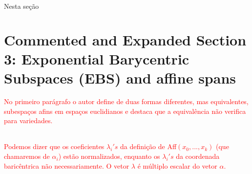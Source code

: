 \documentclass[a4paper,titlepage]{article}
\newcommand{\juliana}[1]{\textcolor{red}{#1}}
\begin{document}
Nesta seção

\vspace{1em}
\vspace{1em}

\begin{center}
\end{center}


\section{Commented and Expanded Section 3: Exponential Barycentric Subspaces
(EBS) and affine spans}
{
\vspace{1em}
\vspace{1em}
}

\juliana{No primeiro parágrafo o autor define de duas formas diferentes, mas equivalentes, subespaços afins em espaços euclidianos e destaca que a equivalência não verifica para variedades.}

\\
\juliana{Podemos dizer que os coeficientes $\lambda_i's$ da definição de Aff$(x_0 ,..., x_k)$ (que chamaremos de $\alpha_i$) estão normalizados, enquanto os $\lambda_i's$ da coordenada baricêntrica não necessariamente. O vetor $\lambda$ é múltiplo escalar do vetor $\alpha$.} 
\end{document}
